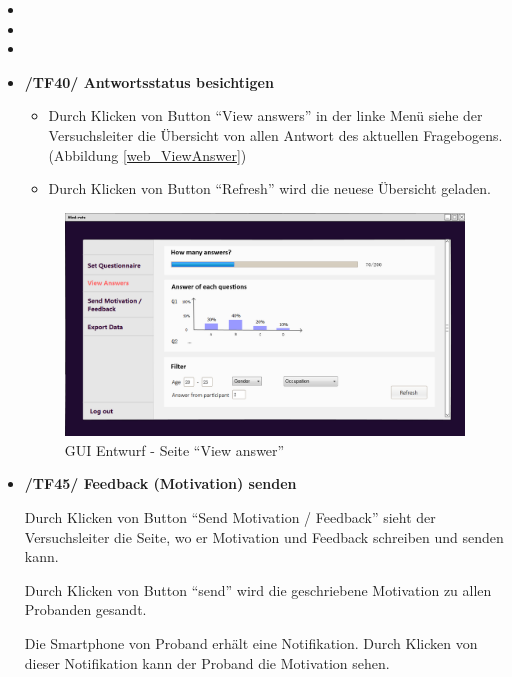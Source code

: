 \documentclass[a4paper]{scrreprt}
\begin{document}
            \begin{itemize}
                \item
                \item
                \item
                \item \textbf{/TF40/ Antwortsstatus besichtigen}
                    \begin{itemize}
                        \item Durch Klicken von Button ``View answers'' in der linke Men\"u siehe der Versuchsleiter die \"Ubersicht von allen Antwort des aktuellen Fragebogens. \\
                        (Abbildung \ref*{web_ViewAnswer})
                        \item Durch Klicken von Button ``Refresh'' wird die neuese \"Ubersicht geladen.
                    \end{itemize}

                    \begin{figure}
                        \centering
                        \includegraphics[scale=0.25]{web_ViewAnswer.png}
                        \caption{GUI Entwurf - Seite ``View answer''}
                    \end{figure}

                \item \textbf{/TF45/ Feedback (Motivation) senden}
                    \par Durch Klicken von Button ``Send Motivation / Feedback'' sieht der Versuchsleiter die Seite, wo er Motivation und Feedback schreiben und senden kann.
                    \par Durch Klicken von Button ``send'' wird die geschriebene Motivation zu allen Probanden gesandt.
                    \par Die Smartphone von Proband erh\"alt eine Notifikation. Durch Klicken von dieser Notifikation kann der Proband die Motivation sehen.
            \end{itemize}
\end{document}
